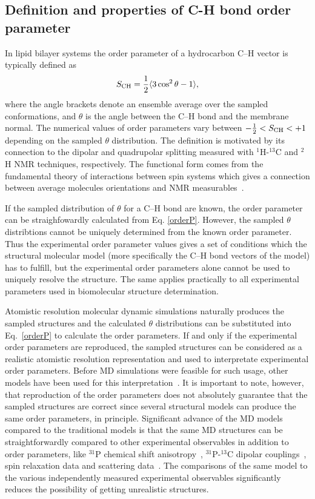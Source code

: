\documentclass[aps,prl,superscriptaddress,twocolumn]{revtex4}
\begin{document}
\subsection{Definition and properties of C-H bond order parameter}\label{OPdefinition}
In lipid bilayer systems the order parameter of a hydrocarbon C--H vector is typically defined as 
\begin{equation}\label{orderP}
S_{{\rm CH}}=\frac{1}{2}\langle 3 \cos^2 \theta-1 \rangle,
\end{equation} 
where the angle brackets denote an ensemble average over the sampled conformations, and $\theta$ is the 
angle between the C--H bond and the membrane normal.
The numerical values of order parameters vary between $-\frac{1}{2} < S_{{\rm CH}} < +1$
depending on the sampled $\theta$ distribution.
The definition is motivated by its connection to the dipolar and quadrupolar splitting measured with
$^1$H-$^{13}$C and $^2$H NMR techniques, respectively. The functional form comes from 
the fundamental theory of interactions between spin systems which gives a connection between 
average molecules orientations and NMR measurables~\cite{abragam}. 

If the sampled distribution of $\theta$ for a C--H bond are known, the order parameter
can be straighfowardly calculated from Eq. \ref{orderP}. However, the sampled $\theta$ 
distribtions cannot be uniquely determined from the known order parameter. Thus the experimental
order parameter values gives a set of conditions which the structural molecular model 
(more specifically the C--H bond vectors of the model) has to fulfill,
but the experimental order parameters alone cannot be used to uniquely 
resolve the structure. The same applies practically to all
experimental parameters used in biomolecular structure determination. 

Atomistic resolution molecular dynamic simulations naturally produces the
sampled structures and the calculated $\theta$ distributions can be substituted
into Eq.~\ref{orderP} to calculate the order parameters.
If and only if the experimental order parameters are
reproduced, the sampled structures can be considered as a realistic
atomistic resolution representation and used to interpretate experimental order parameters.
Before MD simulations were feasible for such usage, other models have been used for 
this interpretation~\cite{seelig74,gally75,seelig77,seelig78,strenk85,baenziger91,hong95b,bruzik97}.
It is important to note, however, that reproduction of the order parameters does not absolutely 
guarantee that the sampled structures are correct since several structural models 
can produce the same order parameters, in principle. 
Significant advance of the MD models compared to the traditional models is that the same MD 
structures can be straightforwardly compared to other experimental observables in addition to order parameters, 
like $^{31}$P chemical shift anisotropy~\cite{chowdhary13}, $^{31}$P-$^{13}$C dipolar couplings~\cite{prakash10},
spin relaxation data \cite{ferreira15} and scattering data~\cite{kucerka10}. The comparisons
of the same model to the various independently measured experimental observables significantly reduces the 
possibility of getting unrealistic structures.
\end{document}
